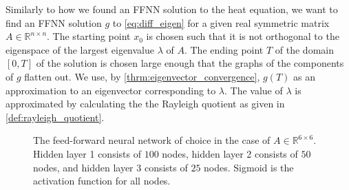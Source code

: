 Similarly to how we found an FFNN solution to the heat equation, we want to find an FFNN solution $g$ to \autoref{eq:diff_eigen} for a given real symmetric matrix $A\in\mathbb{R}^{n\times n}$. The starting point $x_0$ is chosen such that it is not orthogonal to the eigenspace of the largest eigenvalue $\lambda$ of $A$. The ending point $T$ of the domain $[0,T]$ of the solution is chosen large enough that the graphs of the components of $g$ flatten out. We use, by \autoref{thrm:eigenvector_convergence}, $g(T)$ as an approximation to an eigenvector corresponding to $\lambda$. The value of $\lambda$ is approximated by calculating the the Rayleigh quotient as given in \autoref{def:rayleigh_quotient}.

\begin{figure}[H]
\begin{center}
\def\layersep{3cm}
\def\nodeinlayersep{1.5cm}
\end{center}
\caption{The feed-forward neural network of choice in the case of $A\in\mathbb{R}^{6\times 6}$. Hidden layer 1 consists of $100$ nodes, hidden layer 2 consists of $50$ nodes, and hidden layer 3 consists of $25$ nodes. Sigmoid is the activation function for all nodes.}
\label{fig:benchrun4}
\end{figure}

